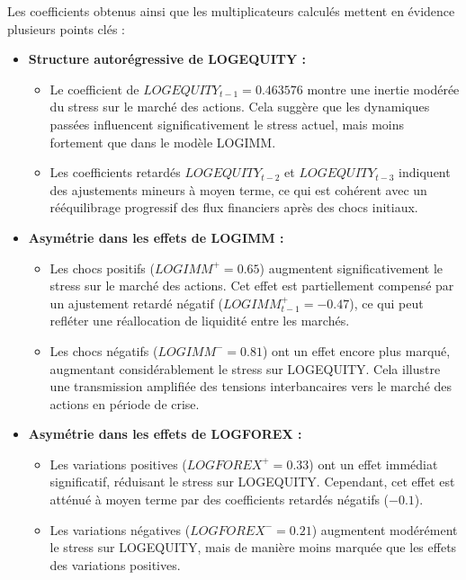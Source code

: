Les coefficients obtenus ainsi que les multiplicateurs calculés mettent en évidence plusieurs points clés :

\begin{itemize}
    \item \textbf{Structure autorégressive de LOGEQUITY :}
    \begin{itemize}
        \item Le coefficient de \(LOGEQUITY_{t-1} = 0.463576\) montre une inertie modérée du stress sur le marché des actions. Cela suggère que les dynamiques passées influencent significativement le stress actuel, mais moins fortement que dans le modèle LOGIMM.
        \item Les coefficients retardés \(LOGEQUITY_{t-2}\) et \(LOGEQUITY_{t-3}\) indiquent des ajustements mineurs à moyen terme, ce qui est cohérent avec un rééquilibrage progressif des flux financiers après des chocs initiaux.
    \end{itemize}

    \item \textbf{Asymétrie dans les effets de LOGIMM :}
    \begin{itemize}
        \item Les chocs positifs (\(LOGIMM^{+} = 0.65\)) augmentent significativement le stress sur le marché des actions. Cet effet est partiellement compensé par un ajustement retardé négatif (\(LOGIMM^{+}_{t-1} = -0.47\)), ce qui peut refléter une réallocation de liquidité entre les marchés.
        \item Les chocs négatifs (\(LOGIMM^{-} = 0.81\)) ont un effet encore plus marqué, augmentant considérablement le stress sur LOGEQUITY. Cela illustre une transmission amplifiée des tensions interbancaires vers le marché des actions en période de crise.
    \end{itemize}

    \item \textbf{Asymétrie dans les effets de LOGFOREX :}
    \begin{itemize}
        \item Les variations positives (\(LOGFOREX^{+} = 0.33\)) ont un effet immédiat significatif, réduisant le stress sur LOGEQUITY. Cependant, cet effet est atténué à moyen terme par des coefficients retardés négatifs (\(-0.1\)).
        \item Les variations négatives (\(LOGFOREX^{-} = 0.21\)) augmentent modérément le stress sur LOGEQUITY, mais de manière moins marquée que les effets des variations positives.
    \end{itemize}
\end{itemize}

